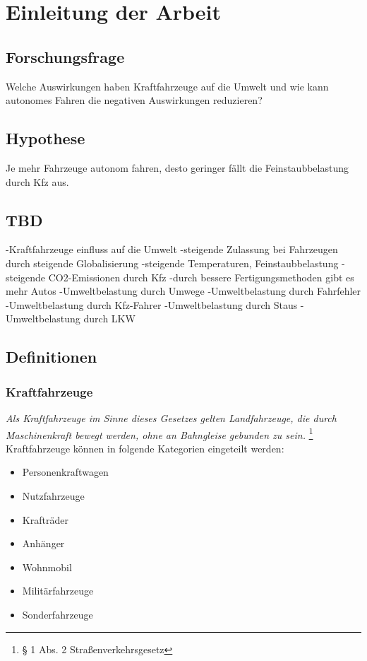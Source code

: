 \chapter{Einleitung der Arbeit}

\section{Forschungsfrage}

Welche Auswirkungen haben Kraftfahrzeuge auf die Umwelt und wie kann autonomes Fahren die negativen Auswirkungen reduzieren?

\section{Hypothese}

Je mehr Fahrzeuge autonom fahren, desto geringer fällt die Feinstaubbelastung durch Kfz aus.



\section{TBD}

-Kraftfahrzeuge einfluss auf die Umwelt
-steigende Zulassung bei Fahrzeugen durch steigende Globalisierung
-steigende Temperaturen, Feinstaubbelastung
-steigende CO2-Emissionen durch Kfz
-durch bessere Fertigungsmethoden gibt es mehr Autos
-Umweltbelastung durch Umwege
-Umweltbelastung durch Fahrfehler
-Umweltbelastung durch Kfz-Fahrer
-Umweltbelastung durch Staus
-Umweltbelastung durch LKW

\section{Definitionen}
\subsection{Kraftfahrzeuge}

\textit{Als Kraftfahrzeuge im Sinne dieses Gesetzes gelten Landfahrzeuge, die durch Maschinenkraft bewegt werden, ohne an Bahngleise gebunden zu sein.}
\footnote{§ 1 Abs. 2 Straßenverkehrsgesetz}
\newline
\newline
Kraftfahrzeuge können in folgende Kategorien eingeteilt werden:
\begin{itemize}
	\item Personenkraftwagen
	\item Nutzfahrzeuge
	\item Krafträder
	\item Anhänger
	\item Wohnmobil
	\item Militärfahrzeuge
	\item Sonderfahrzeuge
\end{itemize}
	      	      	      	      	      
